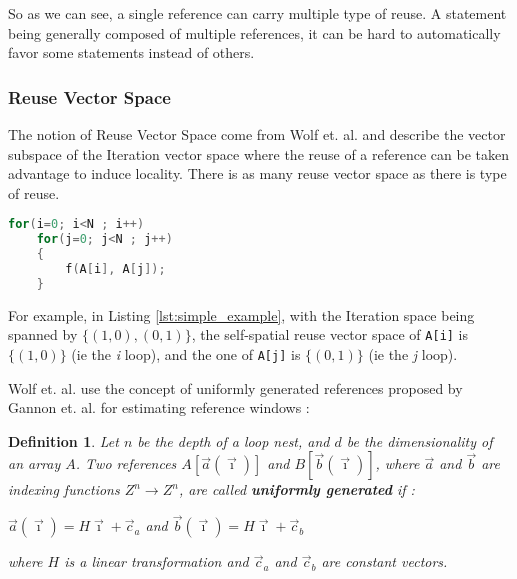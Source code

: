 \documentclass[paper=a4, fontsize=11pt]{scrartcl}
\newtheorem{defn}{Definition}[section]
\numberwithin{equation}{section}        %
\numberwithin{figure}{section}          %
\numberwithin{table}{section}               %
\begin{document}
                So as we can see, a single reference can carry multiple type of reuse.
                A statement being generally composed of multiple references, it 
                can be hard to automatically favor some statements instead of others.
        \subsubsection{Reuse Vector Space}
        \label{sec:wolf_91}
            The notion of Reuse Vector Space come from Wolf et. al.\cite{Wolf'91} and describe
            the vector subspace of the Iteration vector space where the reuse of
            a reference can be taken advantage to induce locality.
            There is as many reuse vector space as there is type of reuse.

\begin{lstlisting}[frame=single, language=C, caption=Simple example, label={lst:simple_example}]
for(i=0; i<N ; i++)
    for(j=0; j<N ; j++)
    {
        f(A[i], A[j]);
    }
\end{lstlisting}

            For example, in Listing \ref{lst:simple_example}, with the Iteration
            space being spanned by $\{(1,0),(0,1)\}$, the self-spatial reuse vector space of
            \verb'A[i]' is $\{(1,0)\}$ (ie the {\it i} loop), and the one of \verb'A[j]' is $\{(0,1)\}$
            (ie the {\it j} loop).

            Wolf et. al. use the concept of uniformly generated references proposed
            by Gannon et. al.\cite{Gannon:1988:SCL:50454.50460} for estimating reference
            windows :
            \begin{defn}
            \label{sec:uniformly_generated}
                Let $n$ be the depth of a loop nest, and $d$ be the dimensionality of
                an array $A$. Two references $A[\vec{a}(\vec{\imath})]$ and
                $B[\vec{b}(\vec{\imath})]$, where $\vec{a}$ and $\vec{b}$ are indexing
                functions $Z^{n} \rightarrow Z^{n}$, are called \textbf{uniformly generated} if :
                \begin{center}
                    $\vec{a}(\vec{\imath}) = H\vec{\imath}+\vec{c}_a$ and $\vec{b}(\vec{\imath}) = H\vec{\imath}+\vec{c}_b$
                \end{center}
                where $H$ is a linear transformation and $\vec{c}_a$ and $\vec{c}_b$ are constant vectors.
            \end{defn}
            
\end{document}
